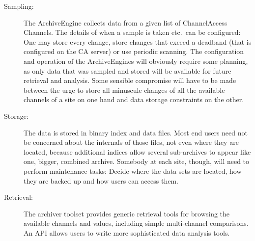 \begin{description}
\item[\sffamily Sampling:]
The ArchiveEngine collects data from a given list of ChannelAccess
Channels.  The details of when a sample is taken etc.\ can be
configured: One may store every change, store changes that exceed a
deadband (that is configured on the CA server) or use periodic
scanning.
The configuration and operation of the ArchiveEngines will obviously
require some planning, as only data that was sampled and stored will
be available for future retrieval and analysis. Some sensible
compromise will have to be made between the urge to store all
minuscule changes of all the available channels of a site on one hand
and data storage constraints on the other.

\item[\sffamily Storage:]
The data is stored in binary index and data files. Most end users need not
be concerned about the internals of those files, not even where they
are located, because additional indices allow several sub-archives to
appear like one, bigger, combined archive.
Somebody at each site, though, will need to perform maintenance
tasks: Decide where the data sets are located, how they are
backed up and how users can access them. 

\item[\sffamily Retrieval:]
The archiver toolset provides generic retrieval tools for browsing the
available channels and values, including simple multi-channel
comparisons.
An API allows users to write more sophisticated data analysis tools.
\end{description}

